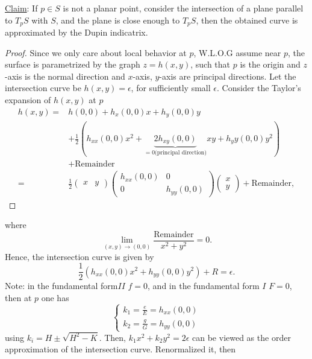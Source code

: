  \underline{Claim}: If \(p\in S\) is not a planar point, consider the 
 intersection of a plane parallel to \(T_p S\) with \(S\), and the plane
 is close enough to \(T_p S\), then the obtained curve is approximated
 by the Dupin indicatrix.
\begin{proof}
    Since we only care about local behavior at \(p\), W.L.O.G assume
     near \(p\), the surface is parametrized by the graph \(z=h(x,y)\),
     such that \(p\) is the origin and \(z\)-axis is the normal direction 
      and \(x\)-axis, \(y\)-axis are principal directions.
      Let the intersection curve be \(h(x,y)=\epsilon\), for sufficiently
      small \(\epsilon\). Consider the Taylor's expansion of 
      \(h(x,y)\) at \(p\)
      \begin{align*}
        h(x,y)=&h(0,0)+h_x(0,0)x+h_y(0,0)y\\
        &+\frac{1}{2}\left(
            h_{xx}(0,0)x^2+\underbrace{2h_{xy}(0,0)}_{
                =0\text{(principal direction)}
            }xy+h_yy(0,0)y^2
        \right)\\
        &+\text{Remainder}\\
        =&\frac{1}{2}\begin{pmatrix}
            x&y
        \end{pmatrix}
        \begin{pmatrix}
            h_{xx}(0,0)&0\\
            0&h_{yy}(0,0)
        \end{pmatrix}
        \begin{pmatrix}
            x\\
            y
        \end{pmatrix}+\text{Remainder},
      \end{align*}
\end{proof}
where 
\[
    \lim_{(x,y)\to (0,0)}    \frac{\text{Remainder}}{x^2+y^2}=0.
\]
Hence, the intersection curve is given by 
\[
    \frac{1}{2}\left(h_{xx}(0,0)x^2+h_{yy}(0,0)y^2\right)+R=\epsilon.    
\]
Note: in the  fundamental form\(II\) \(f=0\), 
and in the   fundamental form \(I\) \(F=0\),
then at \(p\) one has 
\[
    \begin{cases}
        k_1=\frac{e}{E}=h_{xx}(0,0)\\
        k_2=\frac{g}{G}=h_{yy}(0,0)
    \end{cases}    
\]
using \(k_i=H\pm\sqrt{H^2-K}\). Then, \(k_1x^2+k_2y^2=2\epsilon\)
can be viewed as the  order approximation of the 
intersection curve. Renormalized it, then 
